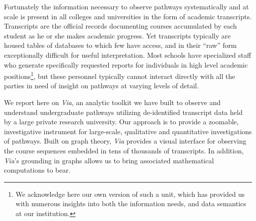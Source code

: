 


Fortunately the information necessary to observe pathways systematically and at scale is present in all colleges and universities in the form of academic transcripts. Transcripts are the official records documenting courses accumulated by each student as he or she makes academic progress. Yet transcripts typically are housed tables of databases to which few have access, and in their ``raw'' form exceptionally difficult for useful interpretation. Most schools have
specialized staff who generate specifically requested reports for
individuals in high level academic positions\footnote{We acknowledge
here our own version of such a unit, which has provided us with numerous insights into both the information needs, and data semantics at our institution.}, but these personnel typically cannot interact directly with all the parties in need of insight on pathways at varying levels of detail.


We report here on {\it Via}, an analytic toolkit we have built to observe and understand undergraduate pathways utilizing de-identified transcript data held by a large private research university. Our approach is to provide a zoomable, investigative
instrument for large-scale, qualitative and quantitative
investigations of pathways. Built on graph theory, {\it Via} provides a
visual interface for observing the course sequences embedded in tens
of thousands of transcripts. In addition, {\it Via}'s grounding in graphs
allows us to bring associated mathematical computations to bear.

